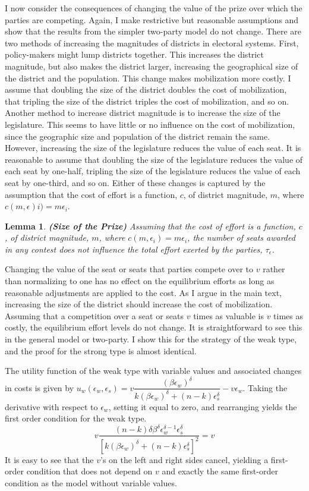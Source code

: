 \documentclass[12pt]{article}
\newtheorem{lemma}{Lemma}
\begin{document}
\begin{appendix}
I now consider the consequences of changing the value of the prize over which the parties are competing. Again, I make restrictive but reasonable assumptions and show that the results from the simpler two-party model do not change. There are two methods of increasing the magnitudes of districts in electoral systems. First, policy-makers might lump districts together. This increases the district magnitude, but also makes the district larger, increasing the geographical size of the district and the population. This change makes mobilization more costly. I assume that doubling the size of the district doubles the cost of mobilization, that tripling the size of the district triples the cost of mobilization, and so on. Another method to increase district magnitude is to increase the size of the legislature. This seems to have little or no influence on the cost of mobilization, since the geographic size and population of the district remain the same. However, increasing the size of the legislature reduces the value of each seat. It is reasonable to assume that doubling the size of the legislature reduces the value of each seat by one-half, tripling the size of the legislature reduces the value of each seat by one-third, and so on. Either of these changes is captured by the assumption that the cost of effort is a function, $c$, of district magnitude, $m$, where $c(m, \epsilon)i) = m\epsilon_i$.
\begin{lemma}
\textbf{(Size of the Prize)} Assuming that the cost of effort is a function, $c$, of district magnitude, $m$, where $c(m, \epsilon_i) = m\epsilon_i$, the number of seats awarded in any contest does not influence the total effort exerted by the parties, $\tau_\epsilon$.
\end{lemma}
Changing the value of the seat or seats that parties compete over to $v$ rather than normalizing to one has no effect on the equilibrium efforts as long as reasonable adjustments are applied to the cost. As I argue in the main text, increasing the size of the district should increase the cost of mobilization. Assuming that a competition over a seat or seats $v$ times as valuable is $v$ times as costly, the equilibrium effort levels do not change. It is straightforward to see this in the general model or two-party. I show this for the strategy of the weak type, and the proof for the strong type is almost identical.  

The utility function of the weak type with variable values and associated changes in costs is given by $u_w(\epsilon_w, \epsilon_s) = v\dfrac{(\beta \epsilon_w)^\delta}{k(\beta \epsilon_w)^\delta + (n-k)\epsilon_s^\delta} - v\epsilon_w$. Taking the derivative with respect to $\epsilon_w$, setting it equal to zero, and rearranging yields the first order condition for the weak type.
\begin{equation}
v\dfrac{(n-k)\delta\beta^\delta \epsilon_w^{\delta-1}\epsilon_s^\delta}{[k(\beta\epsilon_w)^\delta + (n-k)\epsilon_s^\delta]^2} = v
\end{equation}
It is easy to see that the $v$'s on the left and right sides cancel, yielding a first-order condition that does not depend on $v$ and exactly the same first-order condition as the model without variable values.


\end{appendix}
\end{document}
